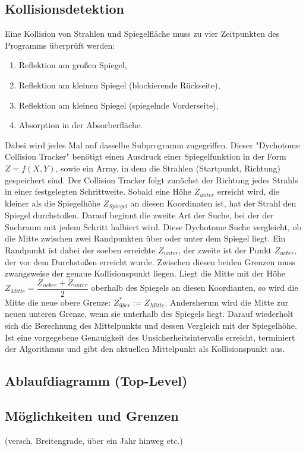 \documentclass[fontsize=10pt,paper=a4,bibliography=totoc]{scrartcl}
\begin{document}
\subsection*{Kollisionsdetektion}
Eine Kollision von Strahlen und Spiegelfläche muss zu vier Zeitpunkten des Programms überprüft werden:
\begin{enumerate}
\item Reflektion am großen Spiegel,
\item Reflektion am kleinen Spiegel (blockierende Rückseite),
\item Reflektion am kleinen Spiegel (spiegelnde Vorderseite),
\item Absorption in der Absorberfläche.
\end{enumerate}
Dabei wird jedes Mal auf dasselbe Subprogramm zugegriffen. Dieser "Dychotome Collision Tracker" benötigt einen Ausdruck einer Spiegelfunktion in der Form $Z = f(X,Y)$, sowie ein Array, in dem die Strahlen (Startpunkt, Richtung) gespeichert sind.
Der Collision Tracker folgt zunächst der Richtung jedes Strahls in einer festgelegten Schrittweite. Sobald eine Höhe $Z_{unter}$ erreicht wird, die kleiner als die Spiegelhöhe $Z_{Spiegel}$ an diesen Koordinaten ist, hat der Strahl den Spiegel durchstoßen.
Darauf beginnt die zweite Art der Suche, bei der der Suchraum mit jedem Schritt halbiert wird. Diese Dychotome Suche vergleicht, ob die Mitte zwischen zwei Randpunkten über oder unter dem Spiegel liegt. Ein Randpunkt ist dabei der soeben erreichte $Z_{unter}$, der zweite ist der Punkt $Z_{ueber}$, der vor dem Durchstoßen erreicht wurde. Zwischen diesen beiden Grenzen muss zwangsweise der genaue Kollisionspunkt liegen. Liegt die Mitte mit der Höhe $Z_{Mitte} = \dfrac{Z_{ueber} + Z_{unter}}{2}$ oberhalb des Spiegels an diesen Koordianten, so wird die Mitte die neue obere Grenze: $Z^{\ast}_{über} := Z_{Mitte}$. Andersherum wird die Mitte zur neuen unteren Grenze, wenn sie unterhalb des Spiegels liegt. Darauf wiederholt sich die Berechnung des Mittelpunkts und dessen Vergleich mit der Spiegelhöhe. Ist eine vorgegebene Genauigkeit des Unsicherheitsintervalls erreicht, terminiert der Algorithmus und gibt den aktuellen Mittelpunkt als Kollisionspunkt aus.

\subsection{Ablaufdiagramm (Top-Level)}
\subsection{Möglichkeiten und Grenzen}
 (versch. Breitengrade, über ein Jahr hinweg etc.)
\end{document}
